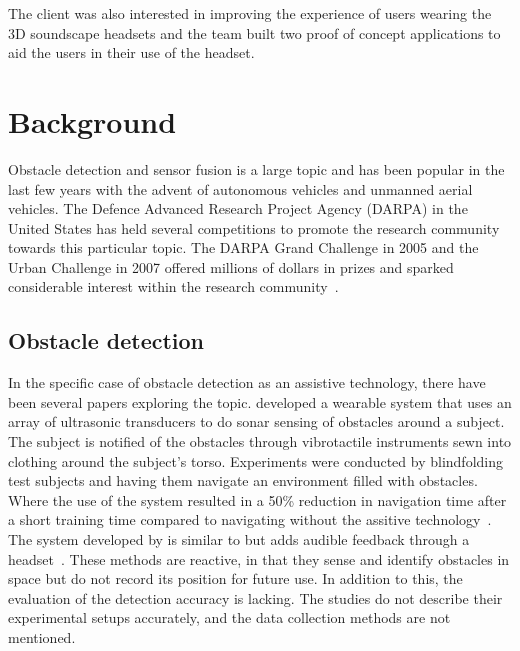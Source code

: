 \documentclass[prodmode,acmtosem]{acmsmall} %
\begin{document}
The client was also interested in improving the experience of users wearing the 3D soundscape headsets and the team built two proof of concept applications to aid the users in their use of the headset.


\section{Background} 
Obstacle detection and sensor fusion is a  large topic and has been popular in the last few years with the advent of autonomous vehicles and unmanned aerial vehicles.
The Defence Advanced Research Project Agency (DARPA) in the United States has held several competitions to promote the research community towards this particular topic. The DARPA Grand Challenge in 2005 and the Urban Challenge in 2007 offered millions of dollars in prizes and sparked considerable interest within the research community~\cite{DARPAGrandChallenge2005,DARPAUrbanChallenge2007}.
\subsection{Obstacle detection}
In the specific case of obstacle detection as an assistive technology, there have been several papers exploring the topic. \citet{Cardin2007} developed a wearable system that uses an array of ultrasonic transducers to do sonar sensing of obstacles around a subject. The subject is notified of the obstacles through vibrotactile instruments sewn into clothing around the subject's torso. Experiments were conducted by blindfolding test subjects and having them navigate an environment filled with obstacles. Where the use of the system resulted in a 50\% reduction in navigation time after a short training time compared to navigating without the assitive technology~\cite{Cardin2007}. The system developed by \citet{Shin2007} is similar to \citet{Cardin2007} but adds audible feedback through a headset~\cite{Shin2007}. These methods are reactive, in that they sense and identify obstacles in space but do not record its position for future use. In addition to this, the evaluation of the detection accuracy is lacking. The studies do not describe their experimental setups accurately, and the data collection methods are not mentioned.
\end{document}
